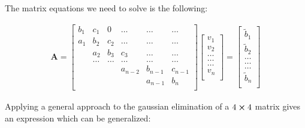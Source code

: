 \documentclass[12pt,norsk,a4paper]{article}
\begin{document}
The matrix equations we need to solve is the following:

\begin{align*}
	\mathbf{A} = \begin{bmatrix}
	b_1& c_1 & 0 &\dots   & \dots &\dots \\
	a_1 & b_2 & c_2 &\dots &\dots &\dots \\
	& a_2 & b_3 & c_3 & \dots & \dots \\
	& \dots   & \dots &\dots   &\dots & \dots \\
	&   &  &a_{n-2}  &b_{n-1}& c_{n-1} \\
	&    &  &   &a_{n-1} & b_n \\
	\end{bmatrix}\begin{bmatrix}
	v_1\\
	v_2\\
	\dots \\
	\dots  \\
	\dots \\
	v_n\\
	\end{bmatrix}
	=\begin{bmatrix}
	\tilde{b}_1\\
	\tilde{b}_2\\
	\dots \\
	\dots \\
	\dots \\
	\tilde{b}_n\\
	\end{bmatrix}
\end{align*}

Applying a general approach to the gaussian elimination of a $4\cross4$ matrix gives an expression which can be generalized:
\end{document}

